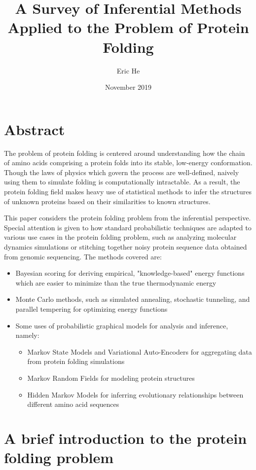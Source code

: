 \documentclass{article}
\title{A Survey of Inferential Methods Applied to the Problem of Protein Folding}
\author{Eric He}
\date{November 2019}
\begin{document}
\maketitle

\section*{Abstract}
The problem of protein folding is centered around understanding how the chain of amino acids comprising a protein folds into its stable, low-energy conformation. Though the laws of physics which govern the process are well-defined, naively using them to simulate folding is computationally intractable. As a result, the protein folding field makes heavy use of statistical methods to infer the structures of unknown proteins based on their similarities to known structures. 

This paper considers the protein folding problem from the inferential perspective. Special attention is given to how standard probabilistic techniques are adapted to various use cases in the protein folding problem, such as analyzing molecular dynamics simulations or stitching together noisy protein sequence data obtained from genomic sequencing. The methods covered are:

\begin{itemize}
    \item Bayesian scoring for deriving empirical, "knowledge-based" energy functions which are easier to minimize than the true thermodynamic energy
    \item Monte Carlo methods, such as simulated annealing, stochastic tunneling, and parallel tempering for optimizing energy functions
    \item Some uses of probabilistic graphical models for analysis and inference, namely:
    \begin{itemize}
        \item Markov State Models and Variational Auto-Encoders for aggregating data from protein folding simulations
        \item Markov Random Fields for modeling protein structures
        \item Hidden Markov Models for inferring evolutionary relationships between different amino acid sequences
    \end{itemize}
\end{itemize}

\newpage
\tableofcontents
\newpage

\section{A brief introduction to the protein folding problem}
\end{document}
